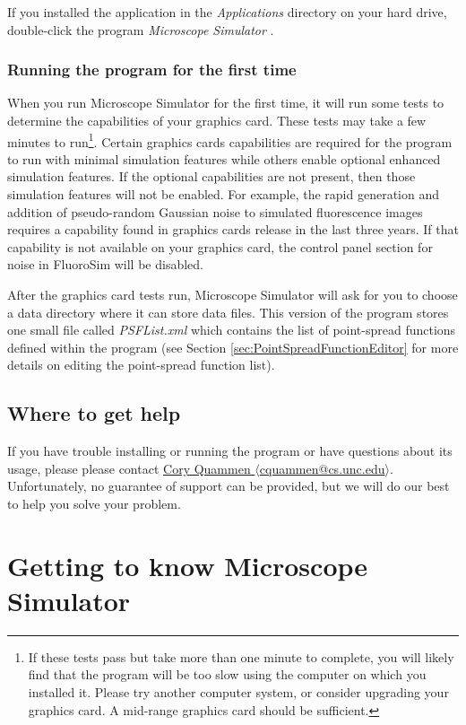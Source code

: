 \documentclass[11pt,titlepage,twoside]{article}
\begin{document}
If you installed the application in the \emph{Applications} directory on your hard drive, double-click the program \emph{Microscope Simulator \ProgramVersionNoSpace}.

\subsubsection{Running the program for the first time}

When you run Microscope Simulator for the first time, it will run some tests to determine the capabilities of your graphics card. These tests may take a few minutes to run\footnote{If these tests pass but take more than one minute to complete, you will likely find that the program will be too slow using the computer on which you installed it. Please try another computer system, or consider upgrading your graphics card. A mid-range graphics card should be sufficient.}. Certain graphics cards capabilities are required for the program to run with minimal simulation features while others enable optional enhanced simulation features. If the optional capabilities are not present, then those simulation features will not be enabled. For example, the rapid generation and addition of pseudo-random Gaussian noise to simulated fluorescence images requires a capability found in graphics cards release in the last three years. If that capability is not available on your graphics card, the control panel section for noise in FluoroSim will be disabled.

After the graphics card tests run, Microscope Simulator will ask for you to choose a data directory where it can store data files. This version of the program stores one small file called \emph{PSFList.xml} which contains the list of point-spread functions defined within the program (see Section \ref{sec:PointSpreadFunctionEditor} for more details on editing the point-spread function list).

\subsection{Where to get help}

If you have trouble installing or running the program or have questions about its usage, please please contact  \href{mailto:cquammen@cs.unc.edu}{Cory Quammen $\langle$cquammen@cs.unc.edu$\rangle$}. Unfortunately, no guarantee of support can be provided, but we will do our best to help you solve your problem.

\section{Getting to know Microscope Simulator}
\end{document}
